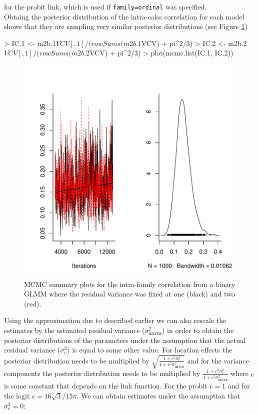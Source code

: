 \documentclass{article}
\begin{document}
for the probit link, which is used if \texttt{family=ordinal} was specified.\\

Obtaing the posterior distribution of the intra-calss correlation for each model shows that they are sampling very similar posterior distributions (see Figure \ref{IC-fig}) 

\begin{Schunk}
\begin{Sinput}
> IC.1 <- m2b.1$VCV[, 1]/(rowSums(m2b.1$VCV) + pi^2/3)
> IC.2 <- m2b.2$VCV[, 1]/(rowSums(m2b.2$VCV) + pi^2/3)
> plot(mcmc.list(IC.1, IC.2))
\end{Sinput}
\end{Schunk}

\begin{figure}[!h]
\begin{center}
\includegraphics{Lecture2-070}
\end{center}
\caption{MCMC summary plots for the intra-family correlation from  a binary GLMM where the residual variance was fixed at one (black) and two (red).}
\label{IC-fig}
\end{figure}

Using the approximation due to \citet{Diggle.2004} described earlier we can also rescale the estimates by the estimated residual variance ($\sigma^{2}_{\texttt{units}}$) in order to obtain the posterior distributions of the parameters under the assumption that the actual residual variance ($\sigma^{2}_{e}$) is equal to some other value.  For location effects the posterior distribution needs to be multiplied by $\sqrt{\frac{1+c^{2}\sigma^{2}_{e}}{1+c^{2}\sigma^{2}_{\texttt{units}}}}$ and for the variance components the posterior distribution needs to be multiplied by $\frac{1+c^{2}\sigma^{2}_{e}}{1+c^{2}\sigma^{2}_{\texttt{units}}}$ where $c$ is some constant that depends on the link function. For the probit $c=1$ and for the logit $c=16\sqrt{3}/15\pi$. We can obtain estimates under the assumption that $\sigma^{2}_{e}=0$: 
\end{document}
